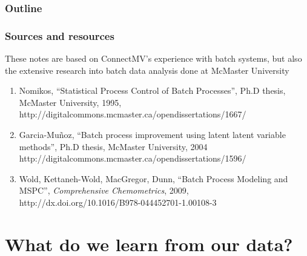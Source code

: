 \documentclass[handout, 12pt]{beamer}
\begin{document}
\begin{frame}\frametitle{Outline}
\tableofcontents
\end{frame}

\begin{frame}\frametitle{Sources and resources}

These notes are based on ConnectMV's experience with batch systems, but also the extensive research into batch data analysis done at McMaster University

\begin{enumerate}

	\item	Nomikos, ``Statistical Process Control of Batch Processes'', Ph.D thesis, McMaster University, 1995, {\scriptsize http://digitalcommons.mcmaster.ca/opendissertations/1667/}
	
	\item	Garcia-Mu\~noz, ``Batch process improvement using latent latent variable methods'', Ph.D thesis, McMaster University, 2004 {\scriptsize http://digitalcommons.mcmaster.ca/opendissertations/1596/}
	
	\item	Wold, Kettaneh-Wold, MacGregor, Dunn, ``Batch Process Modeling and MSPC'', \emph{Comprehensive Chemometrics}, 2009, {\scriptsize http://dx.doi.org/10.1016/B978-044452701-1.00108-3}
\end{enumerate}
\end{frame}

\section{What do we learn from our data?}
\end{document}
